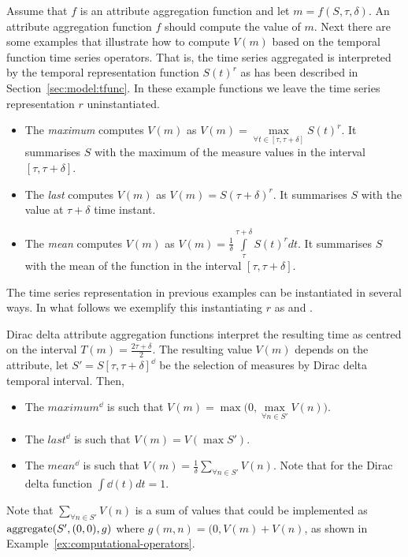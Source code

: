 Assume that $f$ is an attribute aggregation function and let
$m=f(S,\tau,\delta)$.  An attribute aggregation function $f$ should
compute the value of $m$.
%
Next there are some examples that illustrate how to compute $V(m)$
based on the temporal function time series operators. 
That is, the time series aggregated is interpreted by the temporal
representation function $S(t)^r$ as has been described in
Section~\ref{sec:model:tfunc}. 
%
In these example functions we leave the time series representation $r$
uninstantiated.

\begin{itemize}
\item The \emph{maximum} computes $V(m)$ as $V(m) =
  \max\limits_{\forall t \in [\tau,\tau+\delta]} S(t)^r$. It
  summarises $S$ with the maximum of the measure values in the
  interval $[\tau,\tau+\delta]$.
\item The \emph{last} computes $V(m)$ as $V(m) = S(\tau+\delta)^r$. It
  summarises $S$ with the value at $\tau+\delta$ time instant.
\item The \emph{mean} computes $V(m)$ as $V(m) = \frac{1}{\delta}
  \int\limits_{\tau}^{\tau+\delta} S(t)^r dt$. It summarises $S$ with
  the mean of the function in the interval $[\tau,\tau+\delta]$.
\end{itemize}

The time series representation in previous examples can be
instantiated in several ways. In what follows we exemplify this
instantiating $r$ as \dd{} and \zohe{}.

Dirac delta attribute aggregation functions interpret the resulting
time as centred on the interval $T(m)=\frac{2\tau+\delta}{2}$. The
resulting value $V(m)$ depends on the attribute, let
$S'=S[\tau,\tau+\delta]^\dd$ be the selection of measures by Dirac
delta temporal interval. Then,
\begin{itemize}
\item The $maximum^\dd$ is such that $V(m) =
  \max\big(0,\max\limits_{\forall n \in S'} V(n)\big)$.
\item The $last^\dd$ is such that $V(m) = V(\max S')$.
\item The $mean^\dd$ is such that $V(m) = \frac{1}{\delta}
  \sum\limits_{\forall n \in S'} V(n)$. Note that for the Dirac
  delta function $\int\dd(t)dt=1$.
\end{itemize}

Note that $\sum\limits_{\forall n \in S'} V(n)$ is a sum of values
that could be implemented as $\operatorname*{aggregate}(S',(0,0),g)$ where
$g(m,n)=(0,V(m)+V(n)$, as shown in
Example~\ref{ex:computational-operators}.

